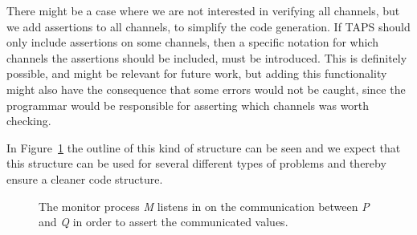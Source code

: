 There might be a case where we are not interested in verifying all channels, but we add assertions to all channels, to simplify the code generation. If TAPS should only include assertions on some channels, then a specific notation for which channels the assertions should be included, must be introduced. This is definitely possible, and might be relevant for future work, but adding this functionality might also have the consequence that some errors would not be caught, since the programmar would be responsible for asserting which channels was worth checking.

In Figure~\ref{fig:assertion_process} the outline of this kind of structure can be seen and we expect that this structure can be used for several different types of problems and thereby ensure a cleaner code structure.
\begin{figure}[!ht]
  \centering
  \caption{The monitor process \textit{M} listens in on the communication between \textit{P} and \textit{Q} in order to assert the communicated values.}
  \label{fig:assertion_process}
\end{figure}




